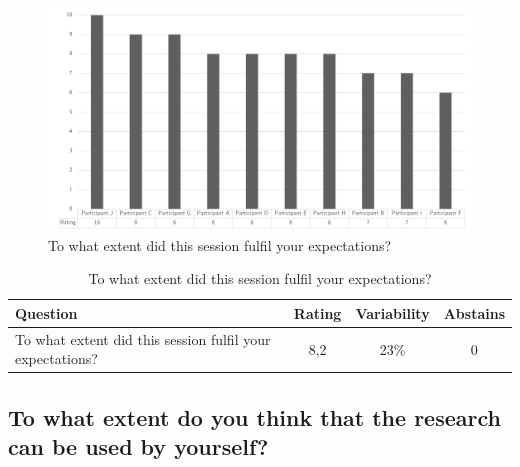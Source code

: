 \begin{figure}[H]
	\centering
	\includegraphics[width=0.9\linewidth]{images/validationresult_fulfilexpectations}
	\caption[To what extent did this session fulfil your expectations?]{To what extent did this session fulfil your expectations?}
	\label{fig:fulfilexpectations}
\end{figure}
\begin{table}[H]
	\centering
	\begin{tabular}{p{}ccc}
		\toprule
		\textbf{Question} & \textbf{Rating} & \textbf{Variability} & \textbf{Abstains} \\
		\midrule
		To what extent did this session fulfil your expectations? & 8,2 & 23\% & 0 \\%
		\bottomrule
	\end{tabular}%
	\caption[To what extent did this session fulfil your expectations?]{To what extent did this session fulfil your expectations?}
	\label{tab:fulfilexpectations}%
\end{table}%

\subsection{To what extent do you think that the research can be used by yourself?}
\label{sub:validationrelevantyourself}

